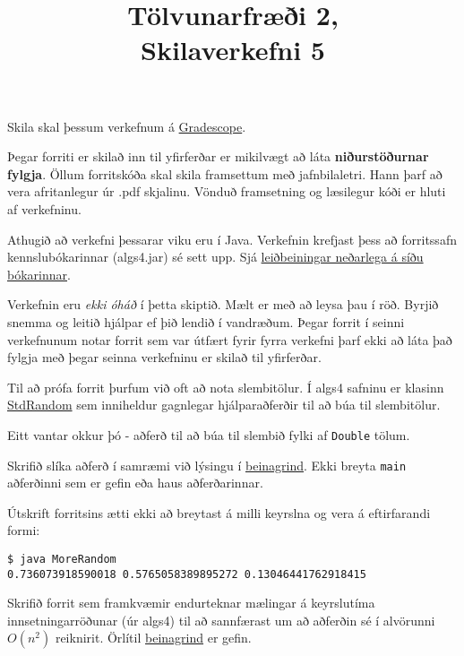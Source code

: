 \documentclass{article}
\title{Tölvunarfræði 2, \semester \\ Skilaverkefni 5}
\author{}
\begin{document}
\maketitle
{}

Skila skal þessum verkefnum á \href{https://gradescope.com/courses/14122}{Gradescope}.

Þegar forriti er skilað inn til yfirferðar er mikilvægt að láta \textbf{niðurstöðurnar fylgja}. Öllum forritskóða skal skila framsettum með jafnbilaletri. Hann þarf að vera afritanlegur úr .pdf skjalinu. Vönduð framsetning og læsilegur kóði er hluti af verkefninu.

Athugið að verkefni þessarar viku eru í Java. Verkefnin krefjast þess að forritssafn kennslubókarinnar (algs4.jar) sé sett upp. Sjá \href{http://algs4.cs.princeton.edu/code/}{leiðbeiningar neðarlega á síðu bókarinnar}.

Verkefnin eru \emph{ekki óháð} í þetta skiptið. Mælt er með að leysa þau í röð. Byrjið snemma og leitið hjálpar ef þið lendið í vandræðum. Þegar forrit í seinni verkefnunum notar forrit sem var útfært fyrir fyrra verkefni þarf ekki að láta það fylgja með þegar seinna verkefninu er skilað til yfirferðar.

\question

Til að prófa forrit þurfum við oft að nota slembitölur. Í algs4 safninu er klasinn \href{https://algs4.cs.princeton.edu/code/edu/princeton/cs/algs4/StdRandom.java.html}{StdRandom} sem inniheldur gagnlegar hjálparaðferðir til að búa til slembitölur.

Eitt vantar okkur þó - aðferð til að búa til slembið fylki af \texttt{Double} tölum.

Skrifið slíka aðferð í samræmi við lýsingu í \href{https://raw.githubusercontent.com/Ernir/kennsluefni/master/T2/Code/w6/MoreRandom.java}{beinagrind}. Ekki breyta \texttt{main} aðferðinni sem er gefin eða haus aðferðarinnar.

Útskrift forritsins ætti ekki að breytast á milli keyrslna og vera á eftirfarandi formi:

\begin{verbatim}
$ java MoreRandom
0.736073918590018 0.5765058389895272 0.13046441762918415
\end{verbatim}

\question

Skrifið forrit sem framkvæmir endurteknar mælingar á keyrslutíma innsetningarröðunar (úr algs4) til að sannfærast um að aðferðin sé í alvörunni $O(n^2)$ reiknirit. Örlítil \href{https://raw.githubusercontent.com/Ernir/kennsluefni/master/T2/Code/w6/PlotRunningTimes.java}{beinagrind} er gefin.
\end{document}

